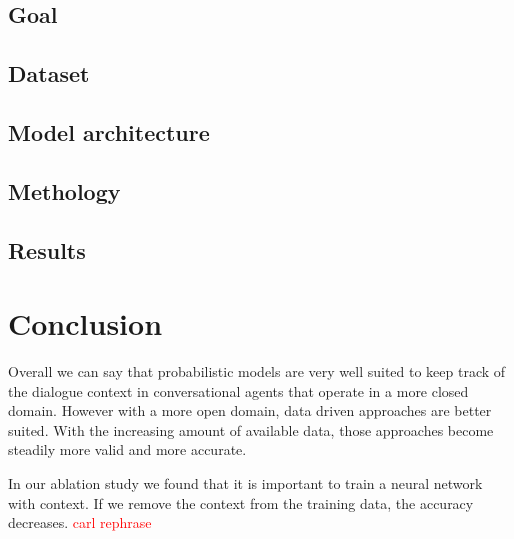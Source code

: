 \documentclass[conference]{IEEEtran}
\newcommand\note[1]{\textcolor{red}{#1}}
\begin{document}
\subsection{Goal}
\subsection{Dataset}
\subsection{Model architecture}
\subsection{Methology}
\subsection{Results}

\section{Conclusion}
Overall we can say that probabilistic models are very well suited to keep track of the dialogue context in conversational agents that operate in a more closed domain. However with a more open domain, data driven approaches are better suited. 
With the increasing amount of available data, those approaches become steadily more valid and more accurate.

In our ablation study we found that it is important to train a neural network with context. If we remove the context from the training data, the accuracy decreases. \note{carl rephrase}




%
%
\end{document}
